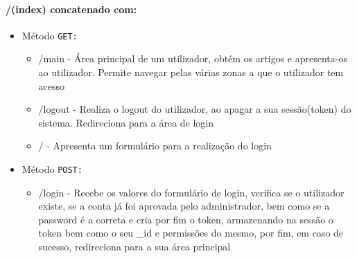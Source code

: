 \paragraph{/(index) concatenado com:}
        \begin{itemize}
            \item Método \texttt{GET:}
                \begin{itemize}
                    \item /main - Área principal de um utilizador, obtém os artigos e apresenta-os ao utilizador. Permite navegar pelas várias zonas a que o utilizador tem acesso
                    \item /logout - Realiza o logout do utilizador, ao apagar a sua sessão(token) do sistema. Redireciona para a área de login
                    \item / - Apresenta um formulário para a realização do login 
                \end{itemize}
            \item Método \texttt{POST:}
                \begin{itemize}
                    \item /login - Recebe os valores do formulário de login, verifica se o utilizador existe, se a conta já foi aprovada pelo administrador, bem como se a password é a correta e cria por fim o token, armazenando na sessão o token bem como o seu \_id e permissões do mesmo, por fim, em caso de sucesso, redireciona para a sua área principal
                \end{itemize}
        \end{itemize}


